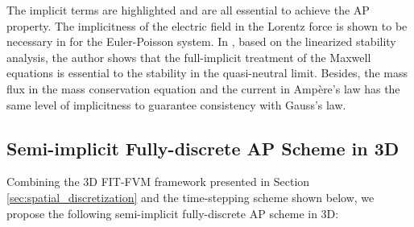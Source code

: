 \documentclass{article}
\begin{document}
The implicit terms are highlighted and are all essential to achieve the AP property. The implicitness of the electric field in the Lorentz force is shown to be necessary in \cite{fabre_1992} for the Euler-Poisson system. In \cite{degond_2012}, based on the linearized stability analysis, the author shows that the full-implicit treatment of the Maxwell equations is essential to the stability in the quasi-neutral limit. Besides, the mass flux in the mass conservation equation and the current in Amp\`{e}re's law has the same level of implicitness to guarantee consistency with Gauss's law.  

\subsection{Semi-implicit Fully-discrete AP Scheme in 3D} \label{sec:3d_ap_scheme}
Combining the 3D FIT-FVM framework presented in Section \ref{sec:spatial_discretization} and the time-stepping scheme shown below, we propose the following semi-implicit fully-discrete AP scheme in 3D:
\end{document}
